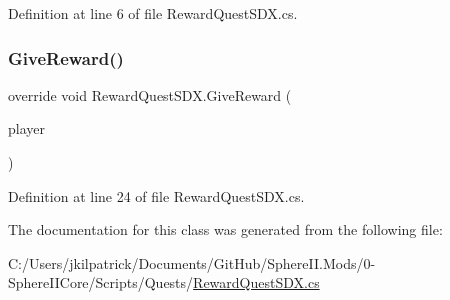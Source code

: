 Definition at line 6 of file Reward\+Quest\+S\+D\+X.\+cs.

\mbox{\label{class_reward_quest_s_d_x_ae711090cc0e58e20e0b8c92e4a380fe7}} 
\subsubsection{\texorpdfstring{GiveReward()}{GiveReward()}}
{\footnotesize\ttfamily override void Reward\+Quest\+S\+D\+X.\+Give\+Reward (\begin{DoxyParamCaption}\item[{Entity\+Player}]{player }\end{DoxyParamCaption})}



Definition at line 24 of file Reward\+Quest\+S\+D\+X.\+cs.



The documentation for this class was generated from the following file\+:\begin{DoxyCompactItemize}
\item 
C\+:/\+Users/jkilpatrick/\+Documents/\+Git\+Hub/\+Sphere\+I\+I.\+Mods/0-\/\+Sphere\+I\+I\+Core/\+Scripts/\+Quests/\mbox{\hyperlink{_reward_quest_s_d_x_8cs}{Reward\+Quest\+S\+D\+X.\+cs}}\end{DoxyCompactItemize}

